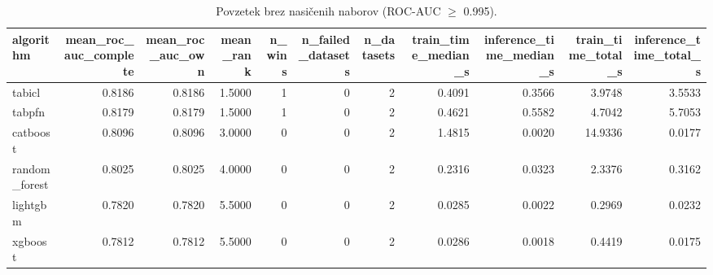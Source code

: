 \begin{table}[htbp]
\centering
\caption{Povzetek brez nasičenih naborov (ROC-AUC $\geq$ 0.995).}
\label{tab:overall-nonsat}
\begin{tabular}{lrrrrrrrrrr}
\hline
algorithm & mean\_roc\_auc\_complete & mean\_roc\_auc\_own & mean\_rank & n\_wins & n\_failed\_datasets & n\_datasets & train\_time\_median\_s & inference\_time\_median\_s & train\_time\_total\_s & inference\_time\_total\_s \\
\hline
tabicl & 0.8186 & 0.8186 & 1.5000 & 1 & 0 & 2 & 0.4091 & 0.3566 & 3.9748 & 3.5533 \\
tabpfn & 0.8179 & 0.8179 & 1.5000 & 1 & 0 & 2 & 0.4621 & 0.5582 & 4.7042 & 5.7053 \\
catboost & 0.8096 & 0.8096 & 3.0000 & 0 & 0 & 2 & 1.4815 & 0.0020 & 14.9336 & 0.0177 \\
random\_forest & 0.8025 & 0.8025 & 4.0000 & 0 & 0 & 2 & 0.2316 & 0.0323 & 2.3376 & 0.3162 \\
lightgbm & 0.7820 & 0.7820 & 5.5000 & 0 & 0 & 2 & 0.0285 & 0.0022 & 0.2969 & 0.0232 \\
xgboost & 0.7812 & 0.7812 & 5.5000 & 0 & 0 & 2 & 0.0286 & 0.0018 & 0.4419 & 0.0175 \\
\hline
\end{tabular}
\end{table}
